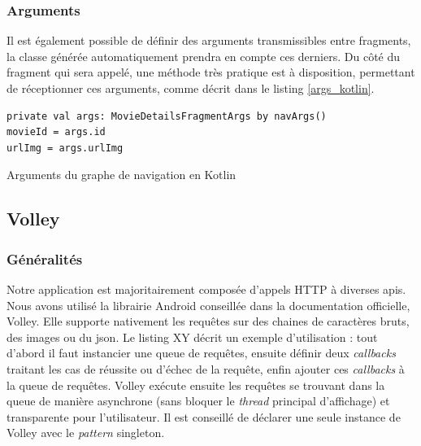 \subsubsection{Arguments}
Il est également possible de définir des arguments transmissibles entre fragments, la classe générée automatiquement prendra en compte ces derniers. Du côté du fragment qui sera appelé, une méthode très pratique est à disposition, permettant de réceptionner ces arguments, comme décrit dans le listing \ref{args_kotlin}.
\bigbreak
\begin{code}
    \begin{verbatim}
private val args: MovieDetailsFragmentArgs by navArgs()
movieId = args.id
urlImg = args.urlImg
    \end{verbatim}
    \caption{Arguments du graphe de navigation en Kotlin}
    \label{args_kotlin}
\end{code}
\bigbreak


\subsection{Volley}
\subsubsection{Généralités}
Notre application est majoritairement composée d'appels HTTP à diverses \acrshort{api}s. Nous avons utilisé la librairie Android conseillée dans la documentation officielle, Volley. Elle supporte nativement les requêtes sur des chaines de caractères bruts, des images ou du \acrshort{json}. Le listing XY décrit un exemple d'utilisation : tout d'abord il faut instancier une queue de requêtes, ensuite définir deux \textit{callbacks} traitant les cas de réussite ou d'échec de la requête, enfin ajouter ces \textit{callbacks} à la queue de requêtes. Volley exécute ensuite les requêtes se trouvant dans la queue de manière asynchrone (sans bloquer le \textit{thread} principal d'affichage) et transparente pour l'utilisateur. Il est conseillé de déclarer une seule instance de Volley avec le \textit{pattern} singleton.


